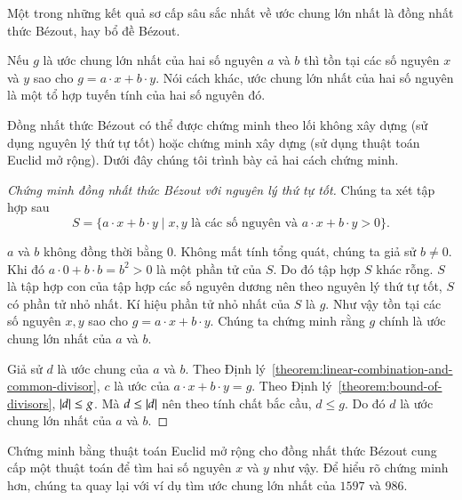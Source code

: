 Một trong những kết quả sơ cấp sâu sắc nhất về ước chung lớn nhất là đồng nhất thức B\'{e}zout, hay bổ đề B\'{e}zout.

\begin{theorem}
	Nếu $g$ là ước chung lớn nhất của hai số nguyên $a$ và $b$ thì tồn tại các số nguyên $x$ và $y$ sao cho $g = a\cdot x + b\cdot y$. Nói cách khác, ước chung lớn nhất của hai số nguyên là một tổ hợp tuyến tính của hai số nguyên đó.
\end{theorem}

Đồng nhất thức B\'{e}zout có thể được chứng minh theo lối không xây dựng (sử dụng nguyên lý thứ tự tốt) hoặc chứng minh xây dựng (sử dụng thuật toán Euclid mở rộng). Dưới đây chúng tôi trình bày cả hai cách chứng minh.

\begin{proof}[Chứng minh đồng nhất thức B\'{e}zout với nguyên lý thứ tự tốt]
	Chúng ta xét tập hợp sau
	\[
		S = \{ a\cdot x + b\cdot y \mid \text{$x, y$ là các số nguyên và $a\cdot x + b\cdot y > 0$} \}.
	\]

	$a$ và $b$ không đồng thời bằng $0$. Không mất tính tổng quát, chúng ta giả sử $b\ne 0$. Khi đó $a\cdot 0 + b\cdot b = b^{2} > 0$ là một phần tử của $S$. Do đó tập hợp $S$ khác rỗng. $S$ là tập hợp con của tập hợp các số nguyên dương nên theo nguyên lý thứ tự tốt, $S$ có phần tử nhỏ nhất. Kí hiệu phần tử nhỏ nhất của $S$ là $g$. Như vậy tồn tại các số nguyên $x, y$ sao cho $g = a\cdot x + b\cdot y$. Chúng ta chứng minh rằng $g$ chính là ước chung lớn nhất của $a$ và $b$.

	Giả sử $d$ là ước chung của $a$ và $b$. Theo Định lý~\ref{theorem:linear-combination-and-common-divisor}, $c$ là ước của $a\cdot x + b\cdot y = g$. Theo Định lý~\ref{theorem:bound-of-divisors}, $\left\vert{d}\right\vert\leq g$. Mà $d\leq \left\vert{d}\right\vert$ nên theo tính chất bắc cầu, $d\leq g$. Do đó $d$ là ước chung lớn nhất của $a$ và $b$.
\end{proof}

Chứng minh bằng thuật toán Euclid mở rộng cho đồng nhất thức B\'{e}zout cung cấp một thuật toán để tìm hai số nguyên $x$ và $y$ như vậy. Để hiểu rõ chứng minh hơn, chúng ta quay lại với ví dụ tìm ước chung lớn nhất của $1597$ và $986$.

